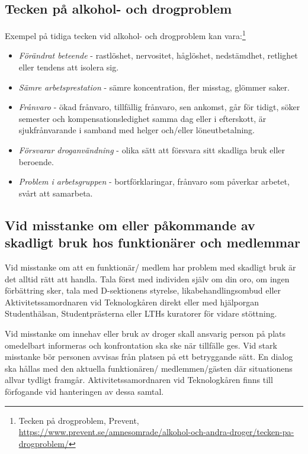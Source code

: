 \documentclass[]{dsekprotokoll}
\begin{document}
\subsection{Tecken på alkohol- och drogproblem}
Exempel på tidiga tecken vid alkohol- och drogproblem kan vara:\footnote{Tecken på drogproblem, Prevent, \url{https://www.prevent.se/amnesomrade/alkohol-och-andra-droger/tecken-pa-drogproblem/}
}
\begin{itemize}
    \item \emph{Förändrat beteende} - rastlöshet, nervositet, håglöshet, nedstämdhet, retlighet eller tendens att isolera sig.
    \item \emph{Sämre arbetsprestation} - sämre koncentration, fler misstag, glömmer saker.
    \item \emph{Frånvaro} - ökad frånvaro, tillfällig frånvaro, sen ankomst, går för tidigt, söker semester och kompensationsledighet samma dag eller i efterskott, är sjukfrånvarande i samband med helger och/eller löneutbetalning.
    \item \emph{Försvarar droganvändning} - olika sätt att försvara sitt skadliga bruk eller beroende.
    \item \emph{Problem i arbetsgruppen} - bortförklaringar, frånvaro som påverkar arbetet, svårt att samarbeta.
\end{itemize}

\subsection{Vid misstanke om eller påkommande av skadligt bruk hos funktionärer och medlemmar}

Vid misstanke om att en funktionär/ medlem har problem med skadligt bruk är det alltid rätt att handla. Tala först med individen själv om din oro, om ingen förbättring sker, tala med D-sektionens styrelse, likabehandlingsombud eller Aktivitetssamordnaren vid Teknologkåren direkt eller med hjälporgan Studenthälsan, Studentprästerna eller LTHs kuratorer för vidare stöttning.

Vid misstanke om innehav eller bruk av droger skall ansvarig person på plats omedelbart informeras och konfrontation ska ske när tillfälle ges. Vid stark misstanke bör personen avvisas från platsen på ett betryggande sätt. En dialog ska hållas med den aktuella funktionären/ medlemmen/gästen där situationens allvar tydligt framgår. Aktivitetssamordnaren vid Teknologkåren finns till förfogande vid hanteringen av dessa samtal.
\end{document}
